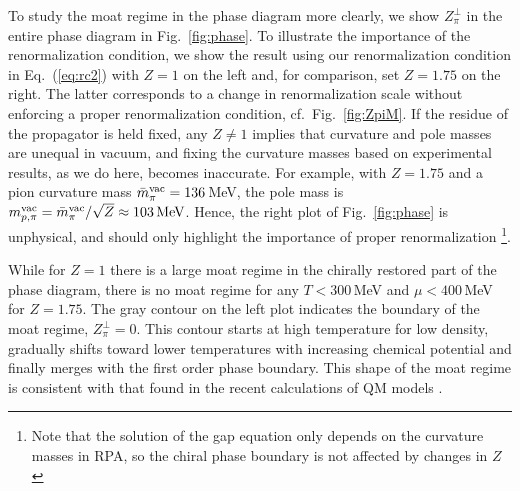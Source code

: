 \documentclass[reprint,english,superscriptaddress,preprintnumbers,amsmath,amssymb,aps,prd]{revtex4-2}
\def\Eq#1{Eq.~(\ref{#1})}
\def\Fig#1{Fig.~\ref{#1}}
\newcommand{\colfab}[1]{\textcolor{magenta}{#1}}
\begin{document}
To study the moat regime in the phase diagram more clearly, we show $Z^\perp_\pi$ in the entire phase diagram in \Fig{fig:phase}. To illustrate the importance of the renormalization condition,
we show the result using our renormalization condition in \Eq{eq:rc2} with $Z=1$ on the left and, for comparison, set $Z=1.75$ on the right. The latter corresponds to a change in renormalization scale without enforcing a proper renormalization condition, cf.\ \Fig{fig:ZpiM}. If the residue of the propagator is held fixed, any $Z \neq 1$ implies that curvature and pole masses are unequal in vacuum, and fixing the curvature masses based on experimental results, as we do here, becomes inaccurate. For example, with $Z=1.75$ and a pion curvature mass $\bar m_\pi^{\rm vac} = 136$\,MeV, the pole mass is $m_{p,\pi}^{\rm vac} = \bar m_\pi^{\rm vac}/\sqrt{Z} \approx 103\,{\rm MeV}$. Hence, the right plot of \Fig{fig:phase} is unphysical, and should only highlight the importance of proper renormalization \footnote{Note that the solution of the gap equation only depends on the curvature masses in RPA, so the chiral phase boundary is not affected by changes in $Z$}.

While for $Z=1$ there is a large moat regime in the chirally restored part of the phase diagram, there is no moat regime for any $T<300$\,MeV and $\mu<400$\,MeV for $Z=1.75$. The gray contour on the left plot indicates the boundary of the moat regime, $Z^\perp_\pi=0$. This contour starts at high temperature for low density, gradually shifts toward lower temperatures with increasing chemical potential and finally merges with the first order phase boundary. This shape of the moat regime is consistent with that found in the recent calculations of QM models \cite{Topfel:2024iop, Cao:2025zvh}. 
\end{document}
